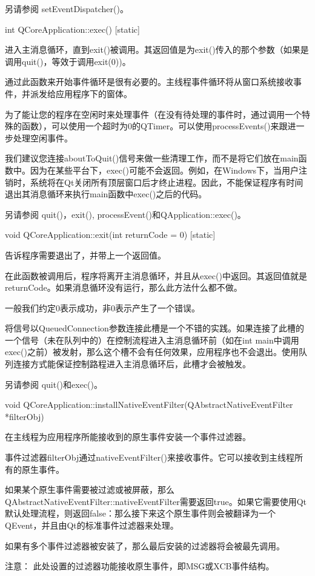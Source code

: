另请参阅 setEventDispatcher()。

int QCoreApplication::exec() [static]

进入主消息循环，直到exit()被调用。其返回值是为exit()传入的那个参数（如果是调用quit()，等效于调用exit(0))。

通过此函数来开始事件循环是很有必要的。主线程事件循环将从窗口系统接收事件，并派发给应用程序下的窗体。

为了能让您的程序在空闲时来处理事件（在没有待处理的事件时，通过调用一个特殊的函数），可以使用一个超时为0的QTimer。可以使用processEvents()来跟进一步处理空闲事件。

我们建议您连接aboutToQuit()信号来做一些清理工作，而不是将它们放在main函数中。因为在某些平台下，exec()可能不会返回。例如，在Windows下，当用户注销时，系统将在Qt关闭所有顶层窗口后才终止进程。因此，不能保证程序有时间退出其消息循环来执行main函数中exec()之后的代码。

另请参阅 quit()，exit(), processEvent()和QApplication::exec()。

void QCoreApplication::exit(int returnCode = 0) [static]

告诉程序需要退出了，并带上一个返回值。

在此函数被调用后，程序将离开主消息循环，并且从exec()中返回。其返回值就是returnCode。如果消息循环没有运行，那么此方法什么都不做。

一般我们约定0表示成功，非0表示产生了一个错误。

将信号以QueuedConnection参数连接此槽是一个不错的实践。如果连接了此槽的一个信号（未在队列中的）在控制流程进入主消息循环前（如在int main中调用exec()之前）被发射，那么这个槽不会有任何效果，应用程序也不会退出。使用队列连接方式能保证控制路程进入主消息循环后，此槽才会被触发。

另请参阅 quit()和exec()。

void QCoreApplication::installNativeEventFilter(QAbstractNativeEventFilter *filterObj)

在主线程为应用程序所能接收到的原生事件安装一个事件过滤器。

事件过滤器filterObj通过nativeEventFilter()来接收事件。它可以接收到主线程所有的原生事件。

如果某个原生事件需要被过滤或被屏蔽，那么QAbstractNativeEventFilter::nativeEventFilter需要返回true。如果它需要使用Qt默认处理流程，则返回false：那么接下来这个原生事件则会被翻译为一个QEvent，并且由Qt的标准事件过滤器来处理。

如果有多个事件过滤器被安装了，那么最后安装的过滤器将会被最先调用。

注意： 此处设置的过滤器功能接收原生事件，即MSG或XCB事件结构。

